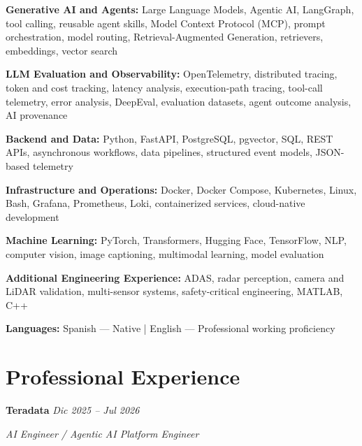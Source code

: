 \documentclass[10pt]{article}
\begin{document}
\textbf{Generative AI and Agents:}
Large Language Models, Agentic AI, LangGraph, tool calling, reusable agent
skills, Model Context Protocol (MCP), prompt orchestration, model routing,
Retrieval-Augmented Generation, retrievers, embeddings, vector search

\textbf{LLM Evaluation and Observability:}
OpenTelemetry, distributed tracing, token and cost tracking, latency analysis,
execution-path tracing, tool-call telemetry, error analysis, DeepEval,
evaluation datasets, agent outcome analysis, AI provenance

\textbf{Backend and Data:}
Python, FastAPI, PostgreSQL, pgvector, SQL, REST APIs, asynchronous workflows,
data pipelines, structured event models, JSON-based telemetry

\textbf{Infrastructure and Operations:}
Docker, Docker Compose, Kubernetes, Linux, Bash, Grafana, Prometheus, Loki,
containerized services, cloud-native development

\textbf{Machine Learning:}
PyTorch, Transformers, Hugging Face, TensorFlow, NLP, computer vision,
image captioning, multimodal learning, model evaluation

\textbf{Additional Engineering Experience:}
ADAS, radar perception, camera and LiDAR validation, multi-sensor systems,
safety-critical engineering, MATLAB, C++

\textbf{Languages:}
Spanish --- Native
\enspace|\enspace
English --- Professional working proficiency


\section*{Professional Experience}

\textbf{Teradata}
\hfill
\textit{Dic 2025 -- Jul 2026}

\textit{AI Engineer / Agentic AI Platform Engineer}
\end{document}

